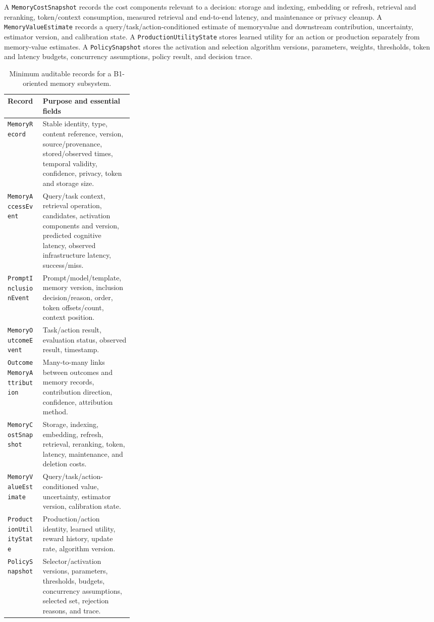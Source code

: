 A \texttt{MemoryCostSnapshot} records the cost components relevant to a decision: storage and indexing, embedding or refresh, retrieval and reranking, token/context consumption, measured retrieval and end-to-end latency, and maintenance or privacy cleanup. A \texttt{MemoryValueEstimate} records a query/task/action-conditioned estimate of \gls{memoryvalue} and downstream contribution, uncertainty, estimator version, and calibration state. A \texttt{ProductionUtilityState} stores learned utility for an action or production separately from memory-value estimates. A \texttt{PolicySnapshot} stores the activation and selection algorithm versions, parameters, weights, thresholds, token and latency budgets, concurrency assumptions, policy result, and decision trace.

\begin{table}[tbp]
\centering
\small
\caption{Minimum auditable records for a B1-oriented memory subsystem.}
\label{tab:ch12-production-schema}
\begin{tabularx}{\linewidth}{@{}>{\raggedright\arraybackslash}p{0.29\linewidth}>{\raggedright\arraybackslash}X@{}}
\toprule
\textbf{Record} & \textbf{Purpose and essential fields} \\
\midrule
\texttt{Memory\allowbreak Record} & Stable identity, type, content reference, version, source/provenance, stored/observed times, temporal validity, confidence, privacy, token and storage size. \\
\texttt{Memory\allowbreak Access\allowbreak Event} & Query/task context, retrieval operation, candidates, activation components and version, predicted cognitive latency, observed infrastructure latency, success/miss. \\
\texttt{Prompt\allowbreak Inclusion\allowbreak Event} & Prompt/model/template, memory version, inclusion decision/reason, order, token offsets/count, context position. \\
\texttt{Memory\allowbreak Outcome\allowbreak Event} & Task/action result, evaluation status, observed result, timestamp. \\
\texttt{Outcome\allowbreak Memory\allowbreak Attribution} & Many-to-many links between outcomes and memory records, contribution direction, confidence, attribution method. \\
\texttt{Memory\allowbreak Cost\allowbreak Snapshot} & Storage, indexing, embedding, refresh, retrieval, reranking, token, latency, maintenance, and deletion costs. \\
\texttt{Memory\allowbreak Value\allowbreak Estimate} & Query/task/action-conditioned value, uncertainty, estimator version, calibration state. \\
\texttt{Production\allowbreak Utility\allowbreak State} & Production/action identity, learned utility, reward history, update rate, algorithm version. \\
\texttt{Policy\allowbreak Snapshot} & Selector/activation versions, parameters, thresholds, budgets, concurrency assumptions, selected set, rejection reasons, and trace. \\
\bottomrule
\end{tabularx}
\end{table}


